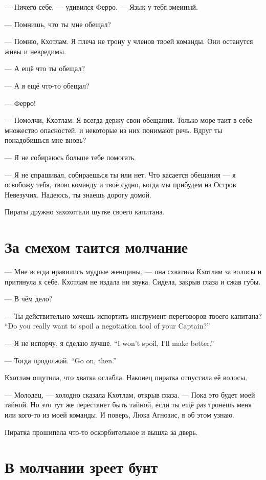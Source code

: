 --- Ничего себе, --- удивился Ферро.
--- Язык у тебя змеиный.

--- Помнишь, что ты мне обещал?

--- Помню, Кхотлам.
Я плеча не трону у членов твоей команды.
Они останутся живы и невредимы.

--- А ещё что ты обещал?

--- А я ещё что-то обещал?

--- Ферро!

--- Помолчи, Кхотлам.
Я всегда держу свои обещания.
Только море таит в себе множество опасностей, и некоторые из них понимают речь.
Вдруг ты понадобишься мне вновь?

--- Я не собираюсь больше тебе помогать.

--- Я не спрашивал, собираешься ты или нет.
Что касается обещания --- я освобожу тебя, твою команду и твоё судно, когда мы прибудем на Остров Невезучих.
Надеюсь, ты знаешь дорогу домой.

Пираты дружно захохотали шутке своего капитана.

\section{За смехом таится молчание}

--- Мне всегда нравились мудрые женщины, --- она схватила Кхотлам за волосы и притянула к себе.
Кхотлам не издала ни звука.
Сидела, закрыв глаза и сжав губы.

--- В чём дело?

{--- Ты действительно хочешь испортить инструмент переговоров твоего капитана?}
{``Do you really want to spoil a negotiation tool of your Captain?''}

{--- Я не испорчу, я сделаю лучше.}
{``I won't spoil, I'll make better.''}

{--- Тогда продолжай.}
{``Go on, then.''}

Кхотлам ощутила, что хватка ослабла.
Наконец пиратка отпустила её волосы.

--- Молодец, --- холодно сказала Кхотлам, открыв глаза.
--- Пока это будет моей тайной.
Но это тут же перестанет быть тайной, если ты ещё раз тронешь меня или кого-то из моей команды.
И поверь, Люка Агнозис, я об этом узнаю.

Пиратка прошипела что-то оскорбительное и вышла за дверь.

\section{В молчании зреет бунт}

